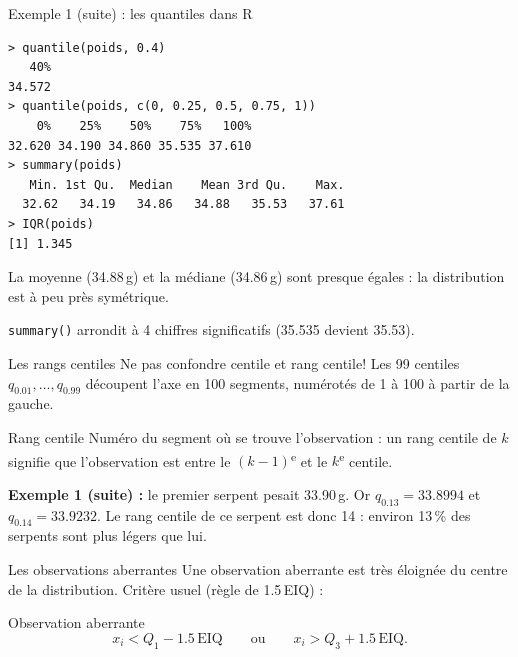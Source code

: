 \documentclass{BeamerTemplate}
\begin{document}
\begin{frame}[fragile,t]{Exemple 1 (suite) : les quantiles dans R}
\begin{Verbatim}[fontsize=\scriptsize, formatcom=\color{TexteBoite}]
> quantile(poids, 0.4)
   40%
34.572
> quantile(poids, c(0, 0.25, 0.5, 0.75, 1))
    0%    25%    50%    75%   100%
32.620 34.190 34.860 35.535 37.610
> summary(poids)
   Min. 1st Qu.  Median    Mean 3rd Qu.    Max.
  32.62   34.19   34.86   34.88   35.53   37.61
> IQR(poids)
[1] 1.345
\end{Verbatim}

  La moyenne (34.88\,g) et la médiane (34.86\,g) sont presque égales : la
  distribution est à peu près \alert{symétrique}.

  \medskip
  {\small\color{gray} \texttt{summary()} arrondit à 4 chiffres significatifs
  (35.535 devient 35.53).}
\end{frame}

\begin{frame}[t]{Les rangs centiles}
  Ne pas confondre \alert{centile} et \alert{rang centile}! Les 99 centiles
  $q_{0.01}, \ldots, q_{0.99}$ découpent l'axe en 100 segments, numérotés de 1
  à 100 à partir de la gauche.

  \begin{Boite}{Rang centile}
    Numéro du segment où se trouve l'observation : un rang centile de $k$
    signifie que l'observation est entre le $(k-1)$\textsuperscript{e} et le
    $k$\textsuperscript{e} centile.
  \end{Boite}


  \textbf{Exemple 1 (suite) :} le premier serpent pesait 33.90\,g. Or
  $q_{0.13} = 33.8994$ et $q_{0.14} = 33.9232$. Le rang centile de ce serpent
  est donc \alert{14} : environ 13\,\% des serpents sont plus légers que lui.

\end{frame}

\begin{frame}[t]{Les observations aberrantes}
  Une observation \alert{aberrante} est très éloignée du centre de la
  distribution. Critère usuel (règle de 1.5\,EIQ) :
  \begin{Boite}{Observation aberrante}
    \[
      x_i < Q_1 - 1.5\,\text{EIQ} \qquad \text{ou} \qquad
      x_i > Q_3 + 1.5\,\text{EIQ}.
    \]
  \end{Boite}


  \medskip
\end{frame}
\end{document}
